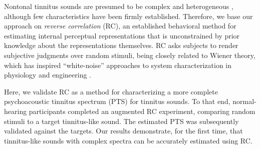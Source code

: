 \documentclass[journal]{IEEEtran}
\begin{document}
Nontonal tinnitus sounds are presumed to be complex and heterogeneous
\cite{vajsakovicPrinciplesMethodsPsychoacoustic2021,henryTinnitusEpidemiologicPerspective2020},
although few characteristics have been firmly established.
Therefore, we base our approach on \textit{reverse correlation} (RC),
an established behavioral method
\cite{ahumadaStimulusFeaturesSignal1971,gosselinSuperstitiousPerceptionsReveal2003,brimijoinInternalRepresentationVowel2013}
for estimating internal perceptual representations that is unconstrained by prior knowledge about the representations themselves.
RC asks subjects to render subjective judgments over random stimuli, being closely related to Wiener theory,
which has inspired ``white-noise'' approaches to system characterization in physiology
\cite{ringachReverseCorrelationNeurophysiology2004,marmarelisWhiteNoiseMethodSystem1978} and engineering \cite{ljungMeasureLackFit1978}.

Here, we validate RC as a method for characterizing a more complete psychoacoustic tinnitus spectrum (PTS) for tinnitus sounds.
To that end, normal-hearing participants completed an augmented RC experiment, comparing random stimuli to a target tinnitus-like sound.
The estimated PTS was subsequently validated against the targets.
Our results demonstrate, for the first time, that tinnitus-like sounds with complex spectra can be accurately estimated using RC. 


% 
% 
% 
% 
\end{document}
